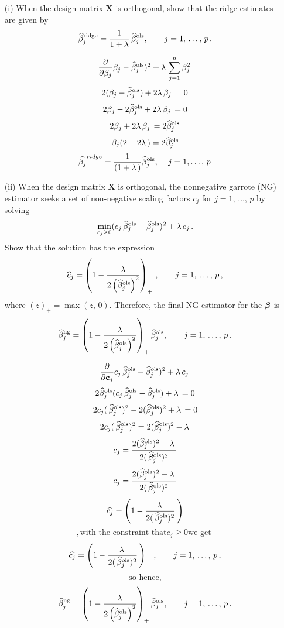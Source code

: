 \documentclass[11pt]{report}
\newcommand{\bfmath}[1]{\mbox{\boldmath$#1$\unboldmath}}
\begin{document}
\begin{itemize}
\item[(i) ] When the design matrix $\mathbf{X}$ is orthogonal, show that the ridge estimates are given by
$$\widehat{\beta}_j^{\rm ridge}=\dfrac{1}{1+\lambda}\,\widehat{\beta}_j^{\rm ols},\qquad j=1,\,\dots,\,p\,.$$ 

$$\frac{\partial }{\partial \beta_j} \beta_j-\widehat{\beta}_j^{\rm ols})^2+\lambda\,\sum_{j=1}^n\beta_j^{2}\, $$
$$ 2(\beta_j-\widehat{\beta}_j^{\rm ols})+2\lambda\,\beta_j\, = 0 $$
$$ 2\beta_j-2\widehat{\beta}_j^{\rm ols}+2\lambda\,\beta_j\, = 0 $$
$$ 2\beta_j+2\lambda\,\beta_j\, = 2\widehat{\beta}_j^{\rm ols} $$
$$ \beta_j(2+2\lambda\,) = 2\widehat{\beta}_j^{\rm ols} $$
$$ \widehat{\beta_j}^{ridge} = \frac{1}{(1+\lambda\,)}\widehat{\beta}_j^{\rm ols} ,\,\quad j=1,\dots,\,p\,$$

\newpage
\item[(ii) ] When the design matrix $\mathbf{X}$ is orthogonal, the nonnegative garrote (NG) estimator seeks a set of non-negative scaling factors $c_j$ for $j=1,\,\dots,\,p$ by solving 
$$\min\limits_{c_j\geq 0}(c_j\,\widehat{\beta}_j^{\rm ols}-\widehat{\beta}_j^{\rm ols})^2+\lambda\,c_j\,.$$
Show that the solution has the expression
$$\widehat{c}_j=\left(1-\dfrac{\lambda}{2\left(\widehat{\beta}_j^{\rm ols} \right)^2} \right)_+\,,\qquad j=1,\,\dots,\,p\,,$$
where $(z)_+=\max(z,\,0)$. Therefore, the final NG estimator for the $\bfmath{\beta}$ is 
$$\widehat{\beta}_j^{\rm ng}=\left(1-\dfrac{\lambda}{2\left(\widehat{\beta}_j^{\rm ols} \right)^2} \right)_+\widehat{\beta}_j^{\rm ols},\qquad j=1,\,\dots,\,p\,. $$ 

$$\frac{\partial }{\partial \mathbf{c}_j} c_j\,\widehat{\beta}_j^{\rm ols}-\widehat{\beta}_j^{\rm ols})^2+\lambda\,c_j\, $$
$$ 2\widehat{\beta}_j^{\rm ols}(c_j\,\widehat{\beta}_j^{\rm ols}-\widehat{\beta}_j^{\rm ols})+\lambda\,= 0 $$ 
$$ 2c_j(\,\widehat{\beta}_j^{\rm ols})^{2}-2(\widehat{\beta}_j^{\rm ols})^{2}+\lambda\,= 0 $$
$$ 2c_j(\,\widehat{\beta}_j^{\rm ols})^{2}= 2(\widehat{\beta}_j^{\rm ols})^{2}-\lambda\, $$
$$ c_j= \frac{2(\widehat{\beta}_j^{\rm ols})^{2}-\lambda\,}{2(\,\widehat{\beta}_j^{\rm ols})^{2}} $$
$$ c_j= \frac{2(\widehat{\beta}_j^{\rm ols})^{2}-\lambda\,}{2(\,\widehat{\beta}_j^{\rm ols})^{2}} $$
$$ \widehat{c_j}= \left( 1 - \frac{\lambda\,}{2(\,\widehat{\beta}_j^{\rm ols})^{2}}\,\right) $$
$$ , \text{with the constraint that} c_j \geq 0 \text{we get }$$
$$ \widehat{c_j}= \left( 1 - \frac{\lambda\,}{2(\,\widehat{\beta}_j^{\rm ols})^{2}}\,\right)_+\,,\qquad j=1,\,\dots,\,p\,, $$
$$\text{so hence,} $$
$$\widehat{\beta}_j^{\rm ng}=\left(1-\dfrac{\lambda}{2\left(\widehat{\beta}_j^{\rm ols} \right)^2} \right)_+\widehat{\beta}_j^{\rm ols},\qquad j=1,\,\dots,\,p\,. $$


\end{itemize}
\end{document}
